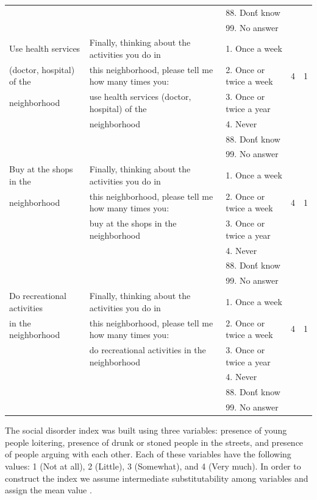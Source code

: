 \documentclass[11pt]{article}
\begin{document}
\begin{landscape}
\begin{tiny}
\begin{tabular}{lllcc}
	&		&	88. Don\'t know 	&		&			\\
	&		&	99. No answer	&		&			\\
Use health services 	&	Finally, thinking about the activities you do in 	&	1. Once a week	&		&			\\
(doctor, hospital) of the	&	this neighborhood, please tell me how many times you:	&	2. Once or twice a week	&	4	&	1		\\
neighborhood	&	use health services (doctor, hospital) of the	&	3. Once or twice a year	&		&			\\
	&	neighborhood	&	4. Never	&		&			\\
	&		&	88. Don\'t know 	&		&			\\
	&		&	99. No answer	&		&			\\
Buy at the shops in the 	&	Finally, thinking about the activities you do in 	&	1. Once a week	&		&			\\
neighborhood	&	this neighborhood, please tell me how many times you:	&	2. Once or twice a week	&	4	&	1		\\
	&	buy at the shops in the neighborhood	&	3. Once or twice a year	&		&			\\
	&		&	4. Never	&		&			\\
	&		&	88. Don\'t know 	&		&			\\
	&		&	99. No answer	&		&			\\
Do recreational activities 	&	Finally, thinking about the activities you do in 	&	1. Once a week	&		&			\\
in the neighborhood	&	this neighborhood, please tell me how many times you:	&	2. Once or twice a week	&	4	&	1		\\
	&	do recreational activities in the neighborhood	&	3. Once or twice a year	&		&			\\
	&		&	4. Never	&		&			\\
	&		&	88. Don\'t know 	&		&			\\
	&		&	99. No answer	&		&			\\\hline


\end{tabular}
\end{tiny}

\end{landscape}
\restoregeometry


\newpage The social disorder index was built using three variables: presence of young people loitering, presence of drunk or stoned people in the streets, and presence of people arguing with each other. Each of these variables have the following values: 1 (Not at all), 2 (Little), 3 (Somewhat), and 4 (Very much). In order to construct the index we assume intermediate substitutability among variables and assign the mean value \citep{goertz2006social}.
\end{document}
